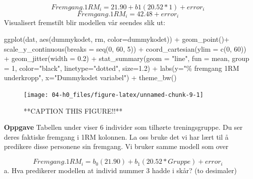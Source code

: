 \documentclass[
]{book}
\newenvironment{Shaded}{\begin{snugshade}}{\end{snugshade}}
\newcommand{\AttributeTok}[1]{\textcolor[rgb]{0.77,0.63,0.00}{#1}}
\newcommand{\DecValTok}[1]{\textcolor[rgb]{0.00,0.00,0.81}{#1}}
\newcommand{\FloatTok}[1]{\textcolor[rgb]{0.00,0.00,0.81}{#1}}
\newcommand{\FunctionTok}[1]{\textcolor[rgb]{0.00,0.00,0.00}{#1}}
\newcommand{\NormalTok}[1]{#1}
\newcommand{\SpecialCharTok}[1]{\textcolor[rgb]{0.00,0.00,0.00}{#1}}
\newcommand{\StringTok}[1]{\textcolor[rgb]{0.31,0.60,0.02}{#1}}
\begin{document}
\[
Fremgang.1RM_i = 21.90 + b1(20.52*1) + error_i
\]
\[
Fremgang.1RM_i = 42.48 + error_i
\]
Visualisert fremstilt blir modellen vår seendes slik ut:

\begin{Shaded}
\begin{Highlighting}[]
\FunctionTok{ggplot}\NormalTok{(dat, }\FunctionTok{aes}\NormalTok{(dummykodet, rm, }\AttributeTok{color=}\NormalTok{dummykodet)) }\SpecialCharTok{+}
  \FunctionTok{geom\_point}\NormalTok{()}\SpecialCharTok{+}
  \FunctionTok{scale\_y\_continuous}\NormalTok{(}\AttributeTok{breaks =} \FunctionTok{seq}\NormalTok{(}\DecValTok{0}\NormalTok{, }\DecValTok{60}\NormalTok{, }\DecValTok{5}\NormalTok{)) }\SpecialCharTok{+}
  \FunctionTok{coord\_cartesian}\NormalTok{(}\AttributeTok{ylim =} \FunctionTok{c}\NormalTok{(}\DecValTok{0}\NormalTok{, }\DecValTok{60}\NormalTok{)) }\SpecialCharTok{+}
  \FunctionTok{geom\_jitter}\NormalTok{(}\AttributeTok{width =} \FloatTok{0.2}\NormalTok{) }\SpecialCharTok{+} 
  \FunctionTok{stat\_summary}\NormalTok{(}\AttributeTok{geom =} \StringTok{"line"}\NormalTok{, }\AttributeTok{fun =}\NormalTok{ mean, }\AttributeTok{group =} \DecValTok{1}\NormalTok{, }\AttributeTok{color=}\StringTok{"black"}\NormalTok{, }\AttributeTok{linetype=}\StringTok{"dotted"}\NormalTok{, }\AttributeTok{size=}\FloatTok{1.2}\NormalTok{) }\SpecialCharTok{+}
  \FunctionTok{labs}\NormalTok{(}\AttributeTok{y=}\StringTok{"\% fremgang 1RM underkropp"}\NormalTok{, }\AttributeTok{x=}\StringTok{"Dummykodet variabel"}\NormalTok{) }\SpecialCharTok{+}
  \FunctionTok{theme\_bw}\NormalTok{()}
\end{Highlighting}
\end{Shaded}

\begin{figure}

{\centering \texttt{[image: 04-h0\_files/figure-latex/unnamed-chunk-9-1]} 

}

\caption{**CAPTION THIS FIGURE!!**}\label{fig:unnamed-chunk-9}
\end{figure}

\textbf{Oppgave}
Tabellen under viser 6 individer som tilhørte treningsgruppe. Du ser deres faktiske fremgang i 1RM kolonnen. La oss bruke det vi har lært til å predikere disse personene sin fremgang. Vi bruker samme modell som over

\[
Fremgang.1RM_i = b_0(21.90) + b_1(20.52*Gruppe) + error_i
\]
a. Hva predikerer modellen at individ nummer 3 hadde i skår? (to desimaler)
\end{document}

